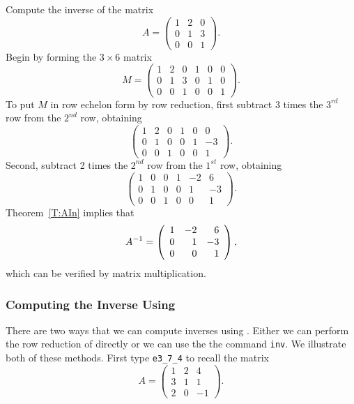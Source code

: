 Compute the inverse of the matrix
\[
A = \left(\begin{array}{rrr} 1 & 2 & 0 \\ 0 & 1 & 3 \\ 0 & 0 & 1
\end{array}\right).
\]
Begin by forming the $3\times 6$ matrix
\[
M = \left(\begin{array}{rrr|rrr} 1 & 2 & 0 & 1 & 0 & 0 \\
0 & 1 & 3 & 0 & 1 & 0 \\ 0 & 0 & 1 & 0 & 0 & 1
\end{array}\right).
\]
To put $M$ in row echelon form by row reduction, first subtract
3 times the $3^{rd}$ row from the $2^{nd}$ row, obtaining
\[
\left(\begin{array}{rrr|rrr} 1 & 2 & 0 & 1 & 0 & 0 \\
0 & 1 & 0 & 0 & 1 & -3 \\ 0 & 0 & 1 & 0 & 0 & 1
\end{array}\right).
\]
Second, subtract 2 times the $2^{nd}$ row from the $1^{st}$ row, obtaining
\[
\left(\begin{array}{rrr|rrr} 1 & 0 & 0 & 1 & -2 & 6 \\
0 & 1 & 0 & 0 & 1 & -3 \\ 0 & 0 & 1 & 0 & 0 & 1
\end{array}\right).
\]
Theorem~\ref{T:AIn} implies that
\[
A^{-1} = \left(\begin{array}{rrr} 1 & -2 & 6 \\ 0 & 1 & -3 \\ 0 & 0 & 1
\end{array}\right),
\]
which can be verified by matrix multiplication.

\subsubsection*{Computing the Inverse Using \Matlab}

There are two ways that we can compute inverses using \Matlab.
Either we can perform the row reduction of  directly
or we can use the \Matlab the command {\tt inv}.  We illustrate
both of these methods. First type {\tt e3\_7\_4} to recall the matrix
\begin{equation*}
A = \left(\begin{array}{rrr} 1 & 2 & 4 \\ 3 & 1 & 1 \\ 2 & 0 & -1
\end{array}\right).
\end{equation*}

